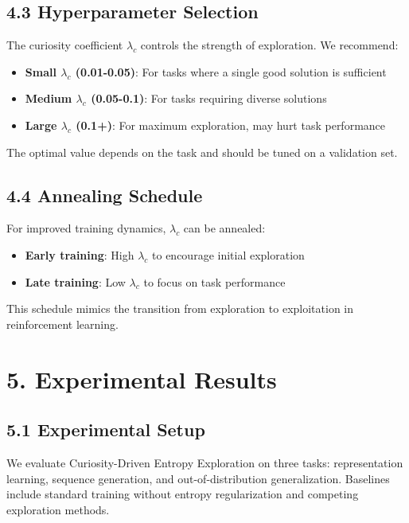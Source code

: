 \documentclass[12pt]{article}
\begin{document}
\subsection{4.3 Hyperparameter Selection}

The curiosity coefficient $\lambda_c$ controls the strength of exploration. We recommend:

\begin{itemize}
\item \textbf{Small $\lambda_c$ (0.01-0.05)}: For tasks where a single good solution is sufficient
\item \textbf{Medium $\lambda_c$ (0.05-0.1)}: For tasks requiring diverse solutions
\item \textbf{Large $\lambda_c$ (0.1+)}: For maximum exploration, may hurt task performance
\end{itemize}

The optimal value depends on the task and should be tuned on a validation set.

\subsection{4.4 Annealing Schedule}

For improved training dynamics, $\lambda_c$ can be annealed:

\begin{itemize}
\item \textbf{Early training}: High $\lambda_c$ to encourage initial exploration
\item \textbf{Late training}: Low $\lambda_c$ to focus on task performance
\end{itemize}

This schedule mimics the transition from exploration to exploitation in reinforcement learning.

\section{5. Experimental Results}

\subsection{5.1 Experimental Setup}

We evaluate Curiosity-Driven Entropy Exploration on three tasks: representation learning, sequence generation, and out-of-distribution generalization. Baselines include standard training without entropy regularization and competing exploration methods.
\end{document}
